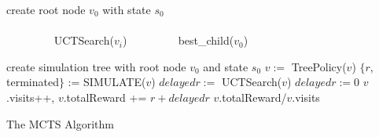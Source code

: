 \begin{algorithm}
\begin{algorithmic}[1]
\State create root node $v_0$ with state $s_0$
 \do \\ \\
~~~~~~~~	UCTSearch($v_i$)
~~~~~~~~	\State \Return best\_child($v_0$)
\EndFor \\
\EndFunction

	\State create simulation tree with root node $v_0$ and state $s_0$
	\State $v := $ TreePolicy($v$)
	\State $\{r$, terminated$\}$ := SIMULATE($v$)
	\State $delayedr :=$ UCTSearch($v$) 
	\Else \State $delayedr := 0$
	\EndIf
	\State $v$.visits++, $v$.totalReward += $ r + delayedr$ 
	\State \Return $v$.totalReward/$v$.visits
\EndFunction
\end{algorithmic}
\caption{The MCTS Algorithm}
\label{alg:mcts}
\end{algorithm}
